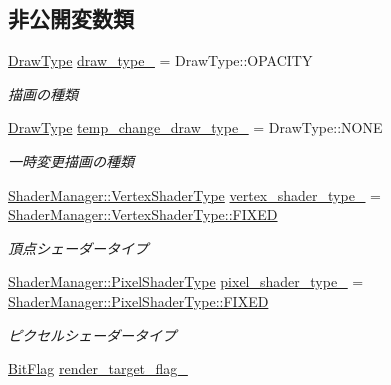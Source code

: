 \subsection*{非公開変数類}
\begin{DoxyCompactItemize}
\item 
\mbox{\hyperlink{class_draw_order_list_a6c9b9ceb312c16d399ef355f4f3486bb}{Draw\+Type}} \mbox{\hyperlink{class_draw_order_list_ad2ce43c1b177ba4dae4198aa272eeb23}{draw\+\_\+type\+\_\+}} = Draw\+Type\+::\+O\+P\+A\+C\+I\+TY
\begin{DoxyCompactList}\small\item\em 描画の種類 \end{DoxyCompactList}\item 
\mbox{\hyperlink{class_draw_order_list_a6c9b9ceb312c16d399ef355f4f3486bb}{Draw\+Type}} \mbox{\hyperlink{class_draw_order_list_a57edbe464013d515f591d2cc98bfcbd0}{temp\+\_\+change\+\_\+draw\+\_\+type\+\_\+}} = Draw\+Type\+::\+N\+O\+NE
\begin{DoxyCompactList}\small\item\em 一時変更描画の種類 \end{DoxyCompactList}\item 
\mbox{\hyperlink{class_shader_manager_a9b51e49d70eb3cc58f6d1f3994e8cfbd}{Shader\+Manager\+::\+Vertex\+Shader\+Type}} \mbox{\hyperlink{class_draw_order_list_afcb0968108f4e6932358393a8bc90a8b}{vertex\+\_\+shader\+\_\+type\+\_\+}} = \mbox{\hyperlink{class_shader_manager_a9b51e49d70eb3cc58f6d1f3994e8cfbdac6e6dc18b53b4c2681394b9d8aefcec7}{Shader\+Manager\+::\+Vertex\+Shader\+Type\+::\+F\+I\+X\+ED}}
\begin{DoxyCompactList}\small\item\em 頂点シェーダータイプ \end{DoxyCompactList}\item 
\mbox{\hyperlink{class_shader_manager_a7d15d773b3c6a99dd7086c45c8b0be5f}{Shader\+Manager\+::\+Pixel\+Shader\+Type}} \mbox{\hyperlink{class_draw_order_list_a8c2adbcac9f724deae8da0a698e93c57}{pixel\+\_\+shader\+\_\+type\+\_\+}} = \mbox{\hyperlink{class_shader_manager_a7d15d773b3c6a99dd7086c45c8b0be5fac6e6dc18b53b4c2681394b9d8aefcec7}{Shader\+Manager\+::\+Pixel\+Shader\+Type\+::\+F\+I\+X\+ED}}
\begin{DoxyCompactList}\small\item\em ピクセルシェーダータイプ \end{DoxyCompactList}\item 
\mbox{\hyperlink{class_bit_flag}{Bit\+Flag}} \mbox{\hyperlink{class_draw_order_list_a9ec6aa2d6330335a0cb5ac037d3dd26d}{render\+\_\+target\+\_\+flag\+\_\+}}

\end{DoxyCompactItemize}
